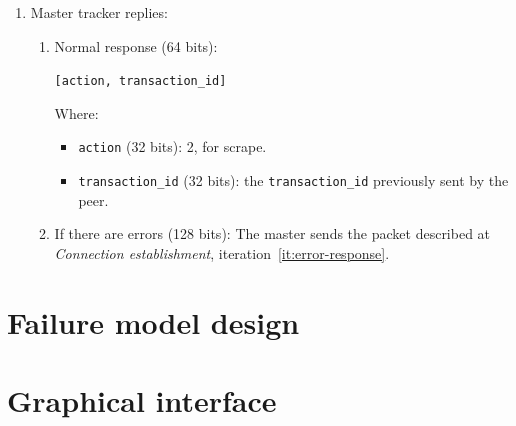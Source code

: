 \documentclass[twoside,a4paper,10pt]{article}
\begin{document}
\begin{itemize}
\begin{itemize}
\begin{enumerate}
    \item Master tracker replies:

      \begin{enumerate}
      \item Normal response (64 bits):

        \texttt{[action, transaction\_id]}

        Where:
        \begin{itemize}
        \item \texttt{action} (32 bits): 2, for scrape.
        \item \texttt{transaction\_id} (32 bits): the \texttt{transaction\_id}
          previously sent by the peer.
        \end{itemize}
        
      \item If there are errors (128 bits): The master sends the packet
        described at \emph{Connection establishment},
        iteration~\ref{it:error-response}.
      \end{enumerate}
    \end{enumerate}
  \end{itemize}
\end{itemize}

\section{Failure model design}

\section{Graphical interface}




\end{document}
